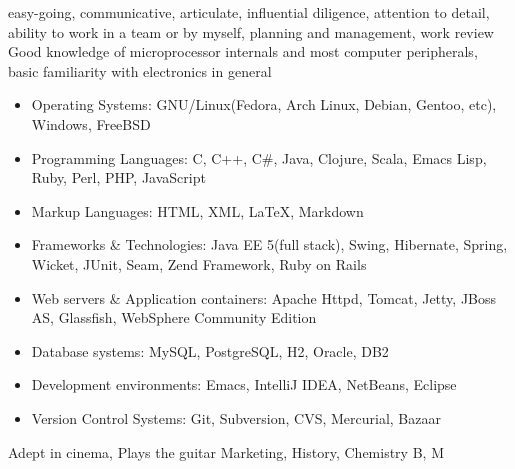 \ecvlanguageheader{(*)}
\ecvlanguagefooter{(*)}
\ecvitem{}{}
\ecvitem{}{}
{
  easy-going, communicative, articulate, influential  
}
{
  diligence, attention to detail, ability to work in a team or by
  myself, planning and management, work review
}
{
  Good knowledge of microprocessor internals and most computer
  peripherals, basic familiarity with electronics in general
}
{
  \begin{itemize}
  \item Operating Systems: GNU/Linux(Fedora, Arch Linux, Debian,
    Gentoo, etc), Windows, FreeBSD
  \item Programming Languages: C, C++, C\#, Java, Clojure, Scala,
    Emacs Lisp, Ruby, Perl, PHP, JavaScript
  \item Markup Languages: HTML, XML, \LaTeX, Markdown
  \item Frameworks \& Technologies: Java EE 5(full stack), Swing, Hibernate,
    Spring, Wicket, JUnit, Seam, Zend Framework, Ruby on Rails
  \item Web servers \& Application containers: Apache Httpd, Tomcat,
    Jetty, JBoss AS, Glassfish, WebSphere Community Edition
  \item Database systems: MySQL, PostgreSQL, H2, Oracle, DB2
  \item Development environments: Emacs, IntelliJ IDEA, NetBeans, Eclipse 
  \item Version Control Systems: Git, Subversion, CVS, Mercurial,
    Bazaar
  \end{itemize}
}
{
  Adept in cinema, Plays the guitar
}
{
  Marketing, History, Chemistry
}
{B, M}

\ecvitem{}{}
\ecvitem{}{}

